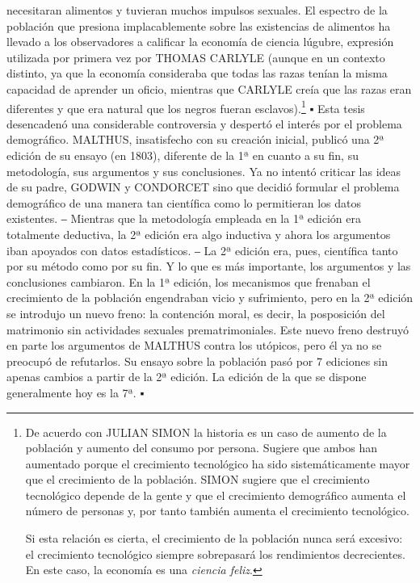 \documentclass[10pt,a4paper]{article}
\begin{document}
necesitaran alimentos y tuvieran muchos impulsos sexuales. El espectro de la población que presiona implacablemente sobre las existencias de alimentos ha llevado a los observadores a calificar la economía de ciencia lúgubre, expresión utilizada por primera vez por THOMAS CARLYLE (aunque en un contexto distinto, ya que la economía consideraba que todas las razas tenían la misma capacidad de aprender un oficio, mientras que CARLYLE creía que las razas eran diferentes y que era natural que los negros fueran esclavos).\footnote{%
    De acuerdo con JULIAN SIMON la historia es un caso de aumento de la población y aumento del consumo por persona. Sugiere que ambos han aumentado porque el crecimiento tecnológico ha sido sistemáticamente mayor que el crecimiento de la población. SIMON sugiere que el crecimiento tecnológico depende de la gente y que el crecimiento demográfico aumenta el número de personas y, por tanto también aumenta el crecimiento tecnológico. 

Si esta relación es cierta, el crecimiento de la población nunca será excesivo: el crecimiento tecnológico siempre sobrepasará los rendimientos decrecientes. En este caso, la economía es una \textit{ciencia feliz}.
}
▪
Esta tesis desencadenó una considerable controversia y despertó el interés por el problema demográfico. MALTHUS, insatisfecho con su creación inicial, publicó una 2ª edición de su ensayo (en 1803), diferente de la 1ª en cuanto a su fin, su metodología, sus argumentos y sus conclusiones. Ya no intentó criticar las ideas de su padre, GODWIN y CONDORCET sino que decidió formular el problema demográfico de una manera tan científica como lo permitieran los datos existentes.
‒
Mientras que la metodología empleada en la 1ª edición era totalmente deductiva, la 2ª edición era algo inductiva y ahora los argumentos iban apoyados con datos estadísticos.
‒
La 2ª edición era, pues, científica tanto por su método como por su fin. Y lo que es más importante, los argumentos y las conclusiones cambiaron. En la 1ª edición, los mecanismos que frenaban el crecimiento de la población engendraban vicio y sufrimiento, pero en la 2ª edición se introdujo un nuevo freno: la contención moral, es decir, la posposición del matrimonio sin actividades sexuales prematrimoniales. Este nuevo freno destruyó en parte los argumentos de MALTHUS contra los utópicos, pero él ya no se preocupó de refutarlos. Su ensayo sobre la población pasó por 7 ediciones sin apenas cambios a partir de la 2ª edición. La edición de la que se dispone generalmente hoy es la 7ª.
▪
\end{document}
